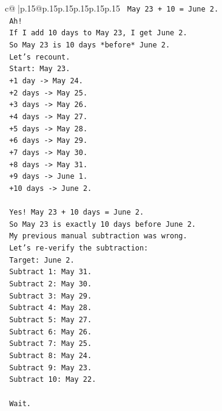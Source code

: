 \documentclass{article}
\begin{document}
{\begin{supertabular}{c@{$\;$}|p{.15\linewidth}@{}p{.15\linewidth}p{.15\linewidth}p{.15\linewidth}p{.15\linewidth}p{.15\linewidth}}
{{{\texttt{    May 23 + 10 = June 2.} \\
\texttt{    Ah!} \\
\texttt{    If I add 10 days to May 23, I get June 2.} \\
\texttt{    So May 23 is 10 days *before* June 2.} \\
\texttt{    Let's recount.} \\
\texttt{    Start: May 23.} \\
\texttt{    +1 day {-}> May 24.} \\
\texttt{    +2 days {-}> May 25.} \\
\texttt{    +3 days {-}> May 26.} \\
\texttt{    +4 days {-}> May 27.} \\
\texttt{    +5 days {-}> May 28.} \\
\texttt{    +6 days {-}> May 29.} \\
\texttt{    +7 days {-}> May 30.} \\
\texttt{    +8 days {-}> May 31.} \\
\texttt{    +9 days {-}> June 1.} \\
\texttt{    +10 days {-}> June 2.} \\
\\ 
\texttt{    Yes! May 23 + 10 days = June 2.} \\
\texttt{    So May 23 is exactly 10 days before June 2.} \\
\texttt{    My previous manual subtraction was wrong.} \\
\texttt{    Let's re{-}verify the subtraction:} \\
\texttt{    Target: June 2.} \\
\texttt{    Subtract 1: May 31.} \\
\texttt{    Subtract 2: May 30.} \\
\texttt{    Subtract 3: May 29.} \\
\texttt{    Subtract 4: May 28.} \\
\texttt{    Subtract 5: May 27.} \\
\texttt{    Subtract 6: May 26.} \\
\texttt{    Subtract 7: May 25.} \\
\texttt{    Subtract 8: May 24.} \\
\texttt{    Subtract 9: May 23.} \\
\texttt{    Subtract 10: May 22.} \\
\\ 
\texttt{    Wait.} \\
}}}
\end{supertabular}}
\end{document}
